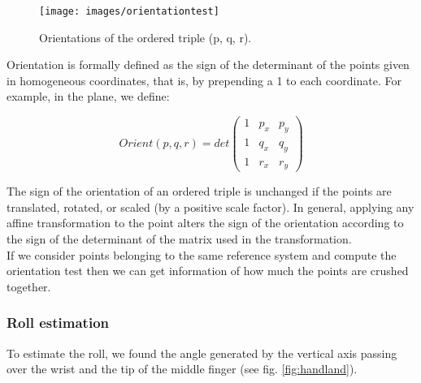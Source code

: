 \begin{figure}[H]
	\centering
	\texttt{[image: images/orientationtest]}
	\caption[Orientation test.]{Orientations of the ordered triple (p, q, r).}
	\label{fig:orientationtest}
\end{figure}

\noindent Orientation is formally defined as the sign of the determinant of the points given in homogeneous coordinates, that is, by prepending a 1 to each coordinate. For example, in the plane, we define:

\begin{Equation}[!htb]
	\centering
	\begin{equation} \label{eq:orientationtest}
		Orient(p,q,r) = det
		\begin{pmatrix}
			1 & p_x & p_y \\
			1 & q_x & q_y \\
			1 & r_x & r_y 
		\end{pmatrix}
		\end{equation}
	\caption[Orientation test.]{Thus orientation generalizes the familiar 1-dimensional binary relations $<, =, >$.}
\end{Equation}

\noindent The sign of the orientation of an ordered triple is unchanged if the points are translated, rotated, or scaled (by a positive scale factor). In general, applying any affine transformation to the point alters the sign of the orientation according to the sign of the determinant of the matrix used in the transformation. \\

\noindent If we consider points belonging to the same reference system and compute the orientation test then we can get information of how much the points are crushed together. 

\subsubsection{Roll estimation}
\label{subsec:roll}
To estimate the roll, we found the angle generated by the vertical axis passing over the wrist and the tip of the middle finger (see fig. \ref{fig:handland}).

